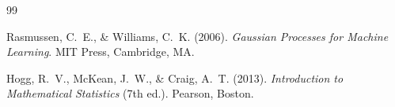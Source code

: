 \documentclass[11pt,a4paper]{article}
\begin{document}
\begin{thebibliography}{99}

Rasmussen, C.~E., \& Williams, C.~K. (2006). \textit{Gaussian Processes for Machine Learning}. MIT Press, Cambridge, MA.

Hogg, R.~V., McKean, J.~W., \& Craig, A.~T. (2013). \textit{Introduction to Mathematical Statistics} (7th ed.). Pearson, Boston.

\end{thebibliography}
\end{document}
